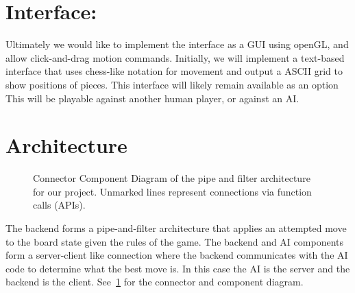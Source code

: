 \documentclass[11pt, oneside]{article}
\begin{document}
\section{Interface:}
Ultimately we would like to implement the interface as a GUI using openGL, and
allow click-and-drag motion commands. Initially, we will implement a text-based
interface that uses chess-like notation for movement and output a ASCII grid to
show positions of pieces. This interface will likely remain available as an
option\\
This will be playable against another human player, or against an AI.

\section{Architecture}
\begin{figure}[H]\label{fig:CCD}
  \centering
  \caption{Connector Component Diagram of the pipe and filter architecture for
    our project. Unmarked lines represent connections via function calls
    (APIs).}
\end{figure}
The backend forms a pipe-and-filter architecture that applies an attempted move
to the board state given the rules of the game. The backend and AI components
form a server-client like connection where the backend communicates with the AI
code to determine what the best move is. In this case the AI is the server and
the backend is the client. See~\ref{fig:CCD} for the connector and component
diagram.
\end{document}
